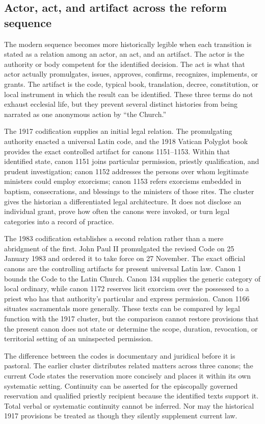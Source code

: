 \subsection{Actor, act, and artifact across the reform sequence}

The modern sequence becomes more historically legible when each transition is
stated as a relation among an actor, an act, and an artifact. The actor is the
authority or body competent for the identified decision. The act is what that
actor actually promulgates, issues, approves, confirms, recognizes,
implements, or grants. The artifact is the code, typical book, translation,
decree, constitution, or local instrument in which the result can be
identified. These three terms do not exhaust ecclesial life, but they prevent
several distinct histories from being narrated as one anonymous action by
``the Church.''

The 1917 codification supplies an initial legal relation. The promulgating
authority enacted a universal Latin code, and the 1918 Vatican Polyglot book
provides the exact controlled artifact for canons 1151--1153. Within that
identified state, canon 1151 joins particular permission, priestly
qualification, and prudent investigation; canon 1152 addresses the persons
over whom legitimate ministers could employ exorcisms; canon 1153 refers
exorcisms embedded in baptism, consecrations, and blessings to the ministers
of those rites. The cluster gives the historian a differentiated legal
architecture. It does not disclose an individual grant, prove how often the
canons were invoked, or turn legal categories into a record of practice.

The 1983 codification establishes a second relation rather than a mere
abridgment of the first. John Paul II promulgated the revised Code on
25 January 1983 and ordered it to take force on 27 November. The exact
official canons are the controlling artifacts for present universal Latin
law. Canon 1 bounds the Code to the Latin Church. Canon 134 supplies the
generic category of local ordinary, while canon 1172 reserves licit exorcism
over the possessed to a priest who has that authority's particular and
express permission. Canon 1166 situates sacramentals more generally. These
texts can be compared by legal function with the 1917 cluster, but the
comparison cannot restore provisions that the present canon does not state or
determine the scope, duration, revocation, or territorial setting of an
uninspected permission.

The difference between the codes is documentary and juridical before it is
pastoral. The earlier cluster distributes related matters across three
canons; the current Code states the reservation more concisely and places it
within its own systematic setting. Continuity can be asserted for the
episcopally governed reservation and qualified priestly recipient because the
identified texts support it. Total verbal or systematic continuity cannot be
inferred. Nor may the historical 1917 provisions be treated as though they
silently supplement current law.


